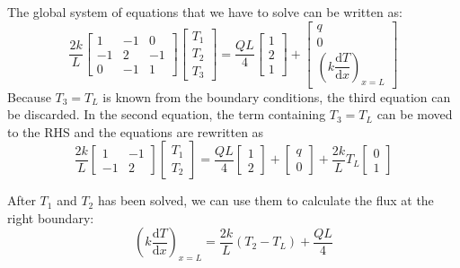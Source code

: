 \documentclass[a4paper,12pt]{article} %
\begin{document}
The global system of equations that we have to solve can be written as:
\begin{equation}
\frac{2k}{L}\begin{bmatrix}
1 & -1 & 0 \\
-1 & 2 & -1 \\
0 & -1 & 1
\end{bmatrix}\begin{bmatrix}
T_{1} \\
T_{2} \\
T_{3}
\end{bmatrix} =
\frac{QL}{4} \begin{bmatrix}
1 \\
2 \\
1
\end{bmatrix} +
\begin{bmatrix}
q \\
0 \\
\left(k\dfrac{\mathrm{d}T}{\mathrm{d}x}\right)_{x=L}
\end{bmatrix}
\end{equation}
Because $T_{3} = T_{L}$ is known from the boundary conditions,
the third equation can be discarded. In the second equation, the term
containing $T_{3} = T_{L}$ can be moved to the RHS and the equations
are rewritten as
\begin{equation}
\frac{2k}{L}\begin{bmatrix}
1 & -1 \\
-1 & 2
\end{bmatrix}\begin{bmatrix}
T_{1} \\
T_{2}
\end{bmatrix} =
\frac{QL}{4} \begin{bmatrix}
1 \\
2
\end{bmatrix} +
\begin{bmatrix}
q \\
0
\end{bmatrix} +
\frac{2k}{L}T_{L}\begin{bmatrix}
0 \\
1
\end{bmatrix}
\end{equation}

After $T_1$ and $T_2$ has been solved, we can use them to calculate the flux
at the right boundary:
\begin{equation}
\left(k \frac{\mathrm{d}T}{\mathrm{d}x} \right)_{x=L} =
\frac{2k}{L}\left( T_2 - T_L \right) + \frac{QL}{4}
\end{equation}
\end{document}
